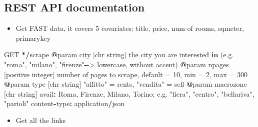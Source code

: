 \documentclass[
  12pt,
  a4paper,
  oneside]{book}
\newenvironment{Shaded}{\begin{snugshade}}{\end{snugshade}}
\newcommand{\ControlFlowTok}[1]{\textcolor[rgb]{0.13,0.29,0.53}{\textbf{#1}}}
\newcommand{\DecValTok}[1]{\textcolor[rgb]{0.00,0.00,0.81}{#1}}
\newcommand{\ErrorTok}[1]{\textcolor[rgb]{0.64,0.00,0.00}{\textbf{#1}}}
\newcommand{\NormalTok}[1]{#1}
\newcommand{\OperatorTok}[1]{\textcolor[rgb]{0.81,0.36,0.00}{\textbf{#1}}}
\newcommand{\StringTok}[1]{\textcolor[rgb]{0.31,0.60,0.02}{#1}}
\providecommand{\tightlist}{%
  \setlength{\itemsep}{0pt}\setlength{\parskip}{0pt}}
\theoremstyle{definition}
\theoremstyle{definition}
\theoremstyle{definition}
\theoremstyle{remark}
\begin{document}
\hypertarget{APIdocs}{%
\subsection{REST API documentation}\label{APIdocs}}

\begin{itemize}
\tightlist
\item
  Get FAST data, it covers 5 covariates: title, price, num of rooms, sqmeter, primarykey
\end{itemize}

\begin{Shaded}
\begin{Highlighting}[]
\NormalTok{      GET }\OperatorTok{*}\ErrorTok{/}\NormalTok{scrape}
      \OperatorTok{@}\NormalTok{param city [chr string] the city you are interested }\ControlFlowTok{in}\NormalTok{ (e.g. }\StringTok{"roma"}\NormalTok{, }\StringTok{"milano"}\NormalTok{, }\StringTok{"firenze"}\OperatorTok{-}\NormalTok{->}\StringTok{ }\NormalTok{lowercase, without accent)}
      \OperatorTok{@}\NormalTok{param npages [positive integer] number of pages to scrape, default =}\StringTok{ }\DecValTok{10}\NormalTok{, min  =}\StringTok{ }\DecValTok{2}\NormalTok{, max =}\StringTok{ }\DecValTok{300}
      \OperatorTok{@}\NormalTok{param type [chr string] }\StringTok{"affitto"}\NormalTok{ =}\StringTok{ }\NormalTok{rents, }\StringTok{"vendita"}\NormalTok{  =}\StringTok{ }\NormalTok{sell }
      \OperatorTok{@}\NormalTok{param macrozone [chr string] avail}\OperatorTok{:}\StringTok{ }\NormalTok{Roma, Firenze, Milano, Torino; e.g. }\StringTok{"fiera"}\NormalTok{, }\StringTok{"centro"}\NormalTok{, }\StringTok{"bellariva"}\NormalTok{, }\StringTok{"parioli"} 
\NormalTok{      content}\OperatorTok{-}\NormalTok{type}\OperatorTok{:}\StringTok{ }\NormalTok{application}\OperatorTok{/}\NormalTok{json }
\end{Highlighting}
\end{Shaded}

\begin{itemize}
\tightlist
\item
  Get all the links
\end{itemize}
\end{document}
